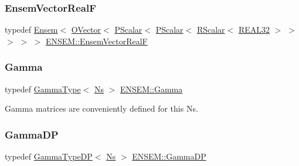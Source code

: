 \mbox{\label{group__defs_ga3a76e6a8a956cba16fc997a3e86fd24b}} 
\subsubsection{\texorpdfstring{EnsemVectorRealF}{EnsemVectorRealF}}
{\footnotesize\ttfamily typedef \mbox{\hyperlink{classENSEM_1_1Ensem}{Ensem}}$<$ \mbox{\hyperlink{classENSEM_1_1OVector}{O\+Vector}}$<$ \mbox{\hyperlink{classENSEM_1_1PScalar}{P\+Scalar}}$<$ \mbox{\hyperlink{classENSEM_1_1PScalar}{P\+Scalar}}$<$ \mbox{\hyperlink{classENSEM_1_1RScalar}{R\+Scalar}}$<$ \mbox{\hyperlink{namespaceENSEM_a7540d01191172323e9073283d772576d}{R\+E\+A\+L32}} $>$ $>$ $>$ $>$ $>$ \mbox{\hyperlink{group__defs_ga3a76e6a8a956cba16fc997a3e86fd24b}{E\+N\+S\+E\+M\+::\+Ensem\+Vector\+RealF}}}

\mbox{\label{group__defs_ga0cf937e0a1681829b6b69762c6b8427b}} 
\subsubsection{\texorpdfstring{Gamma}{Gamma}}
{\footnotesize\ttfamily typedef \mbox{\hyperlink{classENSEM_1_1GammaType}{Gamma\+Type}}$<$ \mbox{\hyperlink{namespaceENSEM_a6f05e048f9b2eb1a19131074f8abc25f}{Ns}} $>$ \mbox{\hyperlink{group__defs_ga0cf937e0a1681829b6b69762c6b8427b}{E\+N\+S\+E\+M\+::\+Gamma}}}



Gamma matrices are conveniently defined for this Ns. 

\mbox{\label{group__defs_ga318782f1c57403a3bb07a1f4e15345c9}} 
\subsubsection{\texorpdfstring{GammaDP}{GammaDP}}
{\footnotesize\ttfamily typedef \mbox{\hyperlink{classENSEM_1_1GammaTypeDP}{Gamma\+Type\+DP}}$<$ \mbox{\hyperlink{namespaceENSEM_a6f05e048f9b2eb1a19131074f8abc25f}{Ns}} $>$ \mbox{\hyperlink{group__defs_ga318782f1c57403a3bb07a1f4e15345c9}{E\+N\+S\+E\+M\+::\+Gamma\+DP}}}



